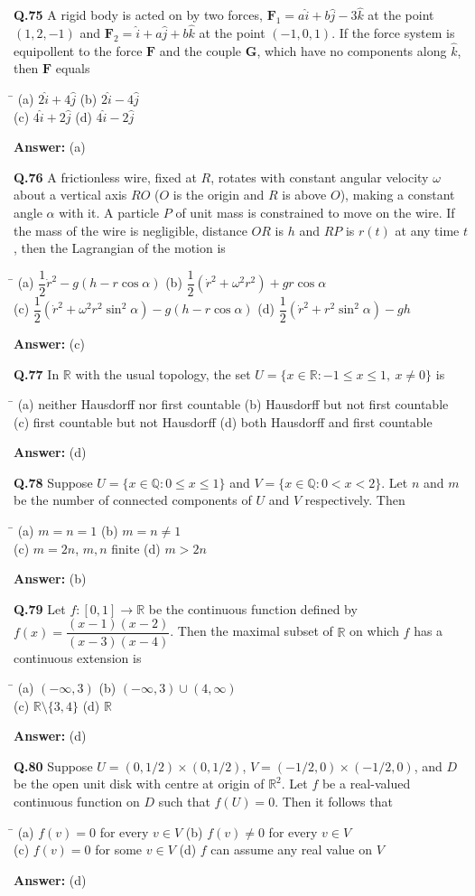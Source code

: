 \documentclass[11pt,a4paper]{article}
\newcommand{\optsfour}[4]{%
  \begin{tabbing}
    \hspace{0.48\linewidth}\=\kill
    (a) #1 \> (b) #2 \\[2pt]
    (c) #3 \> (d) #4
  \end{tabbing}%
}
\newcommand{\ans}[1]{\textbf{Answer:} #1\par\medskip}
\begin{document}
\textbf{Q.75} A rigid body is acted on by two forces, $\mathbf{F}_1 = a\hat{i} + b\hat{j} - 3\hat{k}$ at the point $(1, 2, -1)$ and $\mathbf{F}_2 = \hat{i} + a\hat{j} + b\hat{k}$ at the point $(-1, 0, 1)$. If the force system is equipollent to the force $\mathbf{F}$ and the couple $\mathbf{G}$, which have no components along $\hat{k}$, then $\mathbf{F}$ equals
\optsfour{$2\hat{i} + 4\hat{j}$}{$2\hat{i} - 4\hat{j}$}{$4\hat{i} + 2\hat{j}$}{$4\hat{i} - 2\hat{j}$}
\ans{(a)}

\textbf{Q.76} A frictionless wire, fixed at $R$, rotates with constant angular velocity $\omega$ about a vertical axis $RO$ ($O$ is the origin and $R$ is above $O$), making a constant angle $\alpha$ with it. A particle $P$ of unit mass is constrained to move on the wire. If the mass of the wire is negligible, distance $OR$ is $h$ and $RP$ is $r(t)$ at any time $t$, then the Lagrangian of the motion is
\optsfour{$\dfrac{1}{2}\dot{r}^2 - g(h - r\cos\alpha)$}{$\dfrac{1}{2}(\dot{r}^2 + \omega^2 r^2) + gr\cos\alpha$}{$\dfrac{1}{2}(\dot{r}^2 + \omega^2 r^2\sin^2\alpha) - g(h - r\cos\alpha)$}{$\dfrac{1}{2}(\dot{r}^2 + r^2\sin^2\alpha) - gh$}
\ans{(c)}

\textbf{Q.77} In $\mathbb{R}$ with the usual topology, the set $U = \{x \in \mathbb{R} : -1 \le x \le 1,\ x \ne 0\}$ is
\optsfour{neither Hausdorff nor first countable}{Hausdorff but not first countable}{first countable but not Hausdorff}{both Hausdorff and first countable}
\ans{(d)}

\textbf{Q.78} Suppose $U = \{x \in \mathbb{Q} : 0 \le x \le 1\}$ and $V = \{x \in \mathbb{Q} : 0 < x < 2\}$. Let $n$ and $m$ be the number of connected components of $U$ and $V$ respectively. Then
\optsfour{$m = n = 1$}{$m = n \ne 1$}{$m = 2n$, $m, n$ finite}{$m > 2n$}
\ans{(b)}

\textbf{Q.79} Let $f : [0, 1] \to \mathbb{R}$ be the continuous function defined by $f(x) = \dfrac{(x - 1)(x - 2)}{(x - 3)(x - 4)}$. Then the maximal subset of $\mathbb{R}$ on which $f$ has a continuous extension is
\optsfour{$(-\infty, 3)$}{$(-\infty, 3) \cup (4, \infty)$}{$\mathbb{R} \setminus \{3, 4\}$}{$\mathbb{R}$}
\ans{(d)}

\textbf{Q.80} Suppose $U = (0, 1/2) \times (0, 1/2)$, $V = (-1/2, 0) \times (-1/2, 0)$, and $D$ be the open unit disk with centre at origin of $\mathbb{R}^2$. Let $f$ be a real-valued continuous function on $D$ such that $f(U) = 0$. Then it follows that
\optsfour{$f(v) = 0$ for every $v \in V$}{$f(v) \ne 0$ for every $v \in V$}{$f(v) = 0$ for some $v \in V$}{$f$ can assume any real value on $V$}
\ans{(d)}
\end{document}
